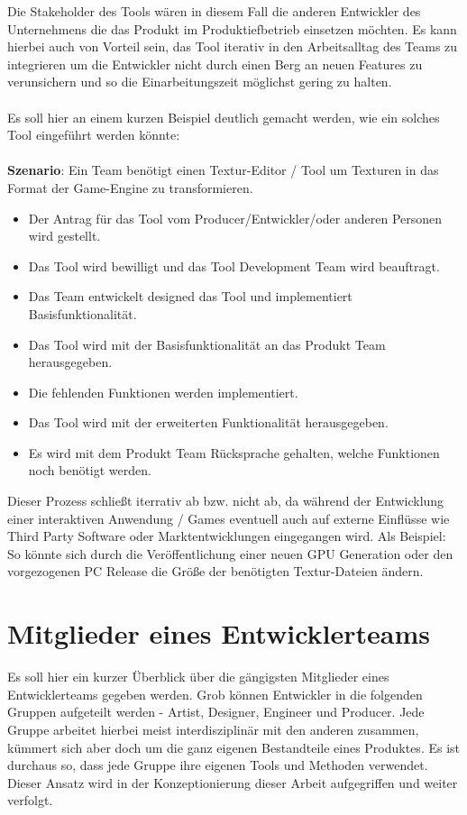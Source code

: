 \documentclass[pagesize, paper=a4, fontsize=12pt, titlepage=true, headings=small, headnosepline, abstractoff, liststotoc, nochapterprefix, plainheadsepline, twoside]{scrreprt}
\begin{document}
Die Stakeholder des Tools wären in diesem Fall die anderen Entwickler des Unternehmens die das Produkt im Produktiefbetrieb einsetzen möchten. Es kann hierbei auch von Vorteil sein, das Tool iterativ in den Arbeitsalltag des Teams zu integrieren um die Entwickler nicht durch einen Berg an neuen Features zu verunsichern und so die Einarbeitungszeit möglichst gering zu halten.
\\
\\
Es soll hier an einem kurzen Beispiel deutlich gemacht werden, wie ein solches Tool eingeführt werden könnte:
\\
\\
\textbf{Szenario}: Ein Team benötigt einen Textur-Editor / Tool um Texturen in das Format der Game-Engine zu transformieren.
\begin{itemize}
\item Der Antrag für das Tool vom Producer/Entwickler/oder anderen Personen wird gestellt.
\item Das Tool wird bewilligt und das Tool Development Team wird beauftragt.
\item Das Team entwickelt designed das Tool und implementiert Basisfunktionalität.
\item Das Tool wird mit der Basisfunktionalität an das Produkt Team herausgegeben.
\item Die fehlenden Funktionen werden implementiert.
\item Das Tool wird mit der erweiterten Funktionalität herausgegeben.
\item Es wird mit dem Produkt Team Rücksprache gehalten, welche Funktionen noch benötigt werden.
\end{itemize}
Dieser Prozess schließt iterrativ ab bzw. nicht ab, da während der Entwicklung einer interaktiven Anwendung / Games eventuell auch auf externe Einflüsse wie Third Party Software oder Marktentwicklungen eingegangen wird. Als Beispiel: So könnte sich durch die Veröffentlichung einer neuen GPU Generation oder den vorgezogenen PC Release die Größe der benötigten Textur-Dateien ändern.

\section{Mitglieder eines Entwicklerteams}
Es soll hier ein kurzer Überblick über die gängigsten Mitglieder eines Entwicklerteams gegeben werden. Grob können Entwickler in die folgenden Gruppen aufgeteilt werden - Artist, Designer, Engineer und Producer. Jede Gruppe arbeitet hierbei meist interdisziplinär mit den anderen zusammen, kümmert sich aber doch um die ganz eigenen Bestandteile eines Produktes. Es ist durchaus so, dass jede Gruppe ihre eigenen Tools und Methoden verwendet. Dieser Ansatz wird in der Konzeptionierung dieser Arbeit aufgegriffen und weiter verfolgt.
\end{document}
